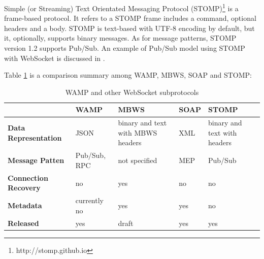 Simple (or Streaming) Text Orientated Messaging Protocol (STOMP)\footnote{http://stomp.github.io} is a frame-based protocol. It refers to a STOMP frame includes a command, optional headers and a body. STOMP is text-based with UTF-8 encoding by default, but it, optionally, supports binary messages. As for message patterns, STOMP version 1.2 supports Pub/Sub. An example of Pub/Sub model using STOMP with WebSocket is discussed in \cite{wang2012definitive}.

Table \ref{table:subprotocol-comparison} is a comparison summary among WAMP, MBWS, SOAP and STOMP:

\begin{table}
\begin{tabular}{|p{2.2cm}|>{\centering\arraybackslash}p{2.2cm}|>{\centering\arraybackslash}p{3cm}|>{\centering\arraybackslash}p{1.5cm}|>{\centering\arraybackslash}p{2.9cm}|} 
\hline %
\textbf{ } & \textbf{WAMP} & \textbf{MBWS} & \textbf{SOAP} & \textbf{STOMP} \\ 
\hline 
\textbf{Data Representation} & JSON & binary and text with MBWS headers & XML & binary and text with headers \\ 
\hline
\textbf{Message Patten} & Pub/Sub, RPC & not specified & MEP & Pub/Sub \\
\hline
\textbf{Connection Recovery} & no & yes & no & no \\
\hline
\textbf{Metadata} & currently no & yes & yes & no \\
\hline
\textbf{Released} & yes & draft & yes & yes \\
\hline
\end{tabular} %
\caption{WAMP and other WebSocket subprotocols}
\label{table:subprotocol-comparison}
\end{table} %
